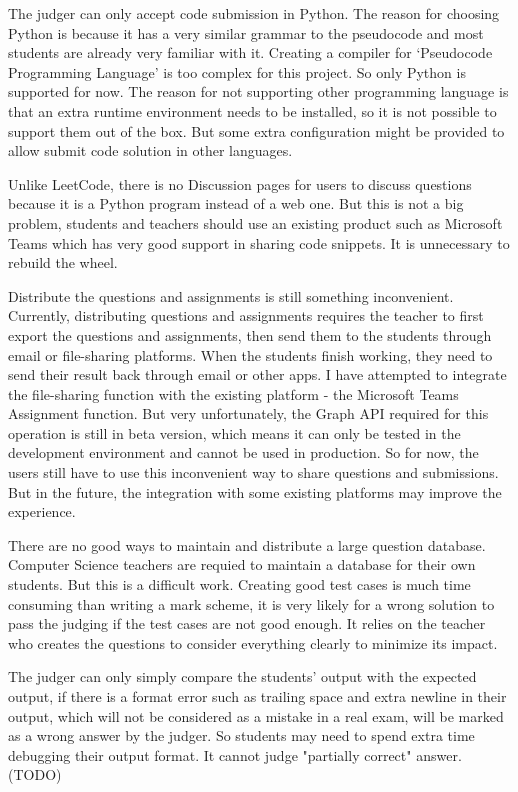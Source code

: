\documentclass[a4paper]{report}
\begin{document}
The judger can only accept code submission in Python. The reason for choosing Python is because it has a very similar grammar to the pseudocode and most students are already very familiar with it. Creating a compiler for `Pseudocode Programming Language' is too complex for this project. So only Python is supported for now. The reason for not supporting other programming language is that an extra runtime environment needs to be installed, so it is not possible to support them out of the box. But some extra configuration might be provided to allow submit code solution in other languages.

Unlike LeetCode, there is no Discussion pages for users to discuss questions because it is a Python program instead of a web one. But this is not a big problem, students and teachers should use an existing product such as Microsoft Teams which has very good support in sharing code snippets. It is unnecessary to rebuild the wheel.

Distribute the questions and assignments is still something inconvenient. Currently, distributing questions and assignments requires the teacher to first export the questions and assignments, then send them to the students through email or file-sharing platforms. When the students finish working, they need to send their result back through email or other apps. I have attempted to integrate the file-sharing function with the existing platform - the Microsoft Teams Assignment function. But very unfortunately, the Graph API required for this operation is still in beta version, which means it can only be tested in the development environment and cannot be used in production. So for now, the users still have to use this inconvenient way to share questions and submissions. But in the future, the integration with some existing platforms may improve the experience.

There are no good ways to maintain and distribute a large question database. Computer Science teachers are requied to maintain a database for their own students. But this is a difficult work. Creating good test cases is much time consuming than writing a mark scheme, it is very likely for a wrong solution to pass the judging if the test cases are not good enough. It relies on the teacher who creates the questions to consider everything clearly to minimize its impact.

The judger can only simply compare the students' output with the expected output, if there is a format error such as trailing space and extra newline in their output, which will not be considered as a mistake in a real exam, will be marked as a wrong answer by the judger. So students may need to spend extra time debugging their output format. It cannot judge "partially correct" answer. (TODO)
\end{document}
